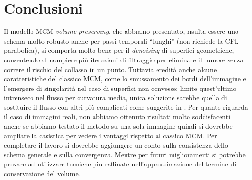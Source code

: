 \chapter*{Conclusioni}
{}

Il modello MCM \emph{volume preserving}, che abbiamo presentato,
risulta essere uno schema molto robusto anche per passi temporali
``lunghi'' (non richiede la CFL parabolica), si comporta molto bene
per il \emph{denoising} di superfici geometriche, consentendo di
compiere più iterazioni di filtraggio per eliminare il rumore senza
correre il rischio del collasso in un punto. Tuttavia eredità anche
alcune caratteristiche del classico MCM, come lo smussamento dei bordi
dell'immagine e l'emergere di singolarità nel caso di superfici non
convesse; limite quest'ultimo intrenseco nel flusso per curvatura media,
unica soluzione sarebbe quella di sostituire il flusso con altri più
complicati come suggerito in \cite{gui:sapiro}. Per quanto riguarda il
caso di immagini reali, non abbiamo ottenuto risultati molto soddisfacenti
anche se abbiamo testato il metodo su una sola immagine quindi
si dovrebbe ampliare la casistica per vedere i vantaggi rispetto al
cassico MCM. Per completare il lavoro si dovrebbe aggiungere  un conto
sulla consistenza dello schema generale e sulla convergenza. Mentre
per futuri miglioramenti si potrebbe provare ad utilizzare tecniche
piu raffinate nell'approssimazione del termine di conservazione del
volume. 
